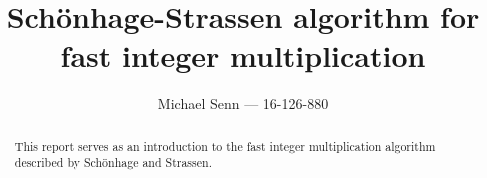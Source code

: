 \documentclass[a4paper]{scrreprt}
\title{Schönhage-Strassen algorithm for fast integer multiplication}
\author{Michael Senn \maillink{michael.senn@students.unibe.ch} --- 16-126-880}
\date{\printdate}
\begin{document}
\maketitle

\begin{abstract}
		This report serves as an introduction to the fast integer multiplication algorithm described by Schönhage and Strassen.
\end{abstract}





\printbibliography
\end{document}
